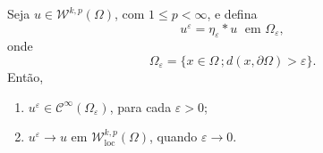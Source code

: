 \documentclass[a4paper, 11pt]{book}
\theoremstyle{definition}
\newcommand{\cC}{\mathcal{C}}
\newcommand{\cW}{\mathcal{W}}
\begin{document}
\begin{tbox} \label{thm:aprox1}
    Seja $u \in \cW^{k,p}(\Omega)$, com $1 \leqslant p < \infty$, e defina
    \[
        u^{\varepsilon} = \eta_{\varepsilon} * u \;\text{ em } \Omega_\varepsilon,
    \]
    onde
    \[
        \Omega_\varepsilon = \{ x \in \Omega \,; d(x,\partial\Omega) > \varepsilon\}.
    \]
    Então,
    \begin{enumerate}[leftmargin=*, label=\textbf{(\alph*)}]
        \item $u^\varepsilon \in \cC^{\infty}(\Omega_\varepsilon)$, para cada $\varepsilon > 0$;
        \item $u^\varepsilon \to u$ em $\cW^{k,p}_{\mathrm{loc}}(\Omega)$, quando $\varepsilon \to 0$.
    \end{enumerate}
\end{tbox}
\end{document}
